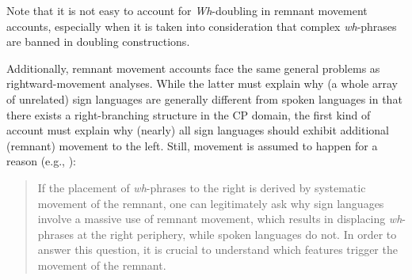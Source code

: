 %

Note that it is not easy to account for \textit{Wh}-doubling in remnant movement accounts, especially when it is taken into consideration that complex \textit{wh}-phrases are banned in doubling constructions.%

Additionally, remnant movement accounts face the same general problems as rightward-movement analyses. While the latter must explain why (a whole array of unrelated) sign languages are generally different from spoken languages in that there exists a right-branching structure in the CP domain, the first kind of account must explain why (nearly) all sign languages should exhibit additional (remnant) movement to the left. Still, movement is assumed to happen for a reason (e.g., \citealt[253]{chomsky1995categories}):

\begin{quote}
If the placement of \textit{wh}-phrases to the right is derived by systematic movement of the remnant, one can legitimately ask why sign languages involve a massive use of remnant movement, which results in displacing \textit{wh}-phrases at the right periphery, while spoken languages do not. In order to answer this question, it is crucial to understand which features trigger the movement of the remnant. \citep[291--292]{cecchetto2009another}
\end{quote}

